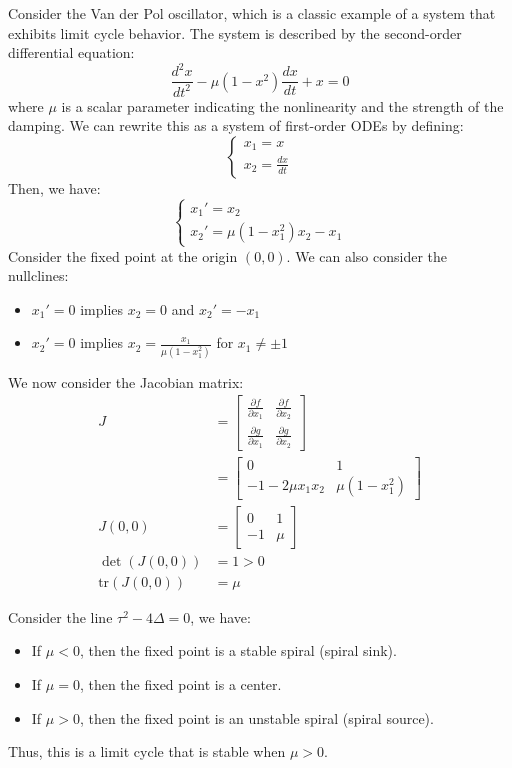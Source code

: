 \documentclass[11pt]{article}
\begin{document}
\begin{example}
    Consider the Van der Pol oscillator, which is a classic example of a system that exhibits limit cycle behavior. The system is described by the second-order differential equation:
    $$\frac{d^2x}{dt^2} - \mu(1 - x^2)\frac{dx}{dt} + x = 0$$
    where \( \mu \) is a scalar parameter indicating the nonlinearity and the strength of the damping. We can rewrite this as a system of first-order ODEs by defining:
    $$\begin{cases}
    x_1 = x \\
    x_2 = \frac{dx}{dt}
    \end{cases}$$
    Then, we have:
    $$\begin{cases}
    x_1' = x_2 \\
    x_2' = \mu(1 - x_1^2)x_2 - x_1
    \end{cases}$$
    Consider the fixed point at the origin \( (0, 0) \). We can also consider the nullclines:
    \begin{itemize}
        \item \( x_1' = 0 \) implies \( x_2 = 0 \) and \( x_2' = -x_1 \)
        \item \( x_2' = 0 \) implies \( x_2 = \frac{x_1}{\mu(1 - x_1^2)} \) for \( x_1 \neq \pm 1 \)
    \end{itemize}

    We now consider the Jacobian matrix:
    \begin{align*}
        J &= \begin{bmatrix}
        \frac{\partial f}{\partial x_1} & \frac{\partial f}{\partial x_2} \\
        \frac{\partial g}{\partial x_1} & \frac{\partial g}{\partial x_2}
        \end{bmatrix} \\ 
        &= \begin{bmatrix}
        0 & 1 \\
        -1 - 2\mu x_1 x_2 & \mu(1 - x_1^2)
        \end{bmatrix} \\
        J(0, 0) &= \begin{bmatrix}
        0 & 1 \\
        -1 & \mu
        \end{bmatrix} \\
        \det(J(0, 0)) &= 1 > 0 \\
        \text{tr}(J(0, 0)) &= \mu
    \end{align*}

    Consider the line $\tau^2 - 4\Delta = 0$, we have:
    \begin{itemize}
        \item If \( \mu < 0 \), then the fixed point is a stable spiral (spiral sink).
        \item If \( \mu = 0 \), then the fixed point is a center.
        \item If \( \mu > 0 \), then the fixed point is an unstable spiral (spiral source).
    \end{itemize}
    Thus, this is a limit cycle that is stable when \( \mu > 0 \). 
\end{example}
\end{document}
